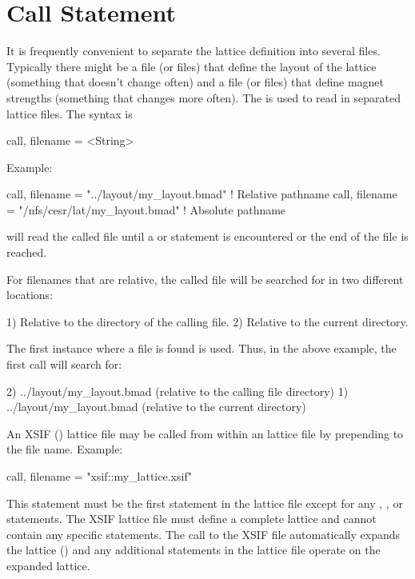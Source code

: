 \section{Call Statement}
\label{s:call}

It is frequently convenient to separate the lattice definition into
several files.  Typically there might be a file (or files) that define
the layout of the lattice (something that doesn't change often) and a
file (or files) that define magnet strengths (something that changes
more often).  The  is used to read in separated lattice
files. The syntax is
\begin{example}
  call, filename = <String>
\end{example}
Example:
\begin{example}
  call, filename = "../layout/my_layout.bmad"      ! Relative pathname
  call, filename = "/nfs/cesr/lat/my_layout.bmad"  ! Absolute pathname
\end{example}
\bmad will read the called file until a  or 
statement is encountered or the end of the file is reached.

For filenames that are relative, the called file will be searched for in
two different locations:
\begin{example}
  1) Relative to the directory of the calling file.
  2) Relative to the current directory.
\end{example}
The first instance where a file is found is used.
Thus, in the above example, the first call will search for:
\begin{example}
  2) ../layout/my_layout.bmad  (relative to the calling file directory)
  1) ../layout/my_layout.bmad  (relative to the current directory)
\end{example}

An XSIF () lattice file may be called
from within an \bmad lattice file by prepending  to the
file name. Example:
\begin{example}
  call, filename = "xsif::my_lattice.xsif"
\end{example}
This statement must be the first statement in the \bmad lattice file
except for any , , or
 statements. The XSIF lattice file must define a
complete lattice and cannot contain any \bmad specific statements. The
call to the XSIF file automatically expands the lattice
() and any additional statements in the \bmad lattice
file operate on the expanded lattice.

